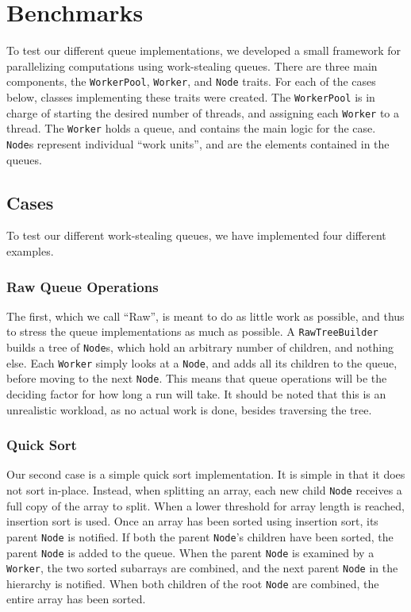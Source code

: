\section{Benchmarks}
To test our different queue implementations, we developed a small framework
for parallelizing computations using work-stealing queues. There are three
main components, the \texttt{WorkerPool}, \texttt{Worker}, and \texttt{Node}
traits. For each of the cases below, classes implementing these traits were
created. The \texttt{WorkerPool} is in charge of starting the desired number
of threads, and assigning each \texttt{Worker} to a thread. The \texttt{Worker}
holds a queue, and contains the main logic for the case. \texttt{Node}s
represent individual ``work units'', and are the elements contained in the
queues.

\label{sec:benchmarks}
\subsection{Cases}
To test our different work-stealing queues, we have implemented four different
examples.
\subsubsection{Raw Queue Operations} %

The first, which we call ``Raw'', is meant to do as little work as possible,
and thus to stress the queue implementations as much as possible. A
\texttt{RawTreeBuilder} builds a tree of \texttt{Node}s, which hold an
arbitrary number of children, and nothing else. Each \texttt{Worker} simply
looks at a \texttt{Node}, and adds all its children to the queue, before
moving to the next \texttt{Node}. This means that queue operations will be the
deciding factor for how long a run will take. It should be noted that this is
an unrealistic workload, as no actual work is done, besides traversing the
tree.

\subsubsection{Quick Sort} %
Our second case is a simple quick sort implementation. It is simple in that it
does not sort in-place. Instead, when splitting an array, each new child
\texttt{Node} receives a full copy of the array to split. When a lower
threshold for array length is reached, insertion sort is used. Once an array
has been sorted using insertion sort, its parent \texttt{Node} is notified. If
both the parent \texttt{Node}'s children have been sorted, the parent
\texttt{Node} is added to the queue. When the parent \texttt{Node} is examined
by a \texttt{Worker}, the two sorted subarrays are combined, and the next
parent \texttt{Node} in the hierarchy is notified. When both children of the
root \texttt{Node} are combined, the entire array has been sorted.

